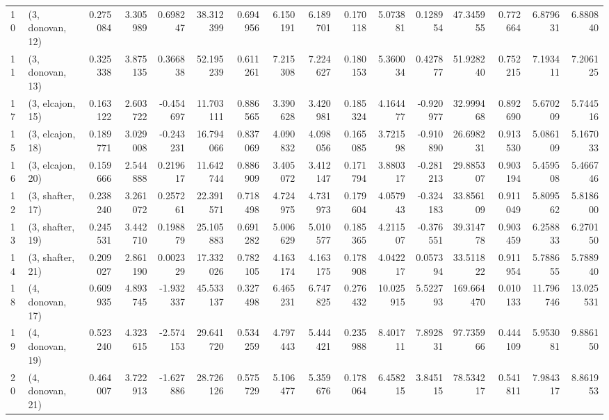 \begin{tabular}{llrrrrrrrrrrrrrr}
10 &  (3, donovan, 12) &   0.275084 &  3.305989 &  0.698247 &  38.312399 &  0.694956 &   6.150191 &  6.189701 &  0.170118 &   5.073881 &  0.128954 &   47.345955 &  0.772664 &   6.879631 &   6.880840 \\
11 &  (3, donovan, 13) &   0.325338 &  3.875135 &  0.366838 &  52.195239 &  0.611261 &   7.215308 &  7.224627 &  0.180153 &   5.360034 &  0.427877 &   51.928240 &  0.752215 &   7.193411 &   7.206125 \\
17 &  (3, elcajon, 15) &   0.163122 &  2.603722 & -0.454697 &  11.703111 &  0.886565 &   3.390628 &  3.420981 &  0.185324 &   4.164477 & -0.920977 &   32.999468 &  0.892690 &   5.670209 &   5.744516 \\
15 &  (3, elcajon, 18) &   0.189771 &  3.029008 & -0.243231 &  16.794066 &  0.837069 &   4.090832 &  4.098056 &  0.165085 &   3.721598 & -0.910890 &   26.698231 &  0.913530 &   5.086109 &   5.167033 \\
16 &  (3, elcajon, 20) &   0.159666 &  2.544888 &  0.219617 &  11.642744 &  0.886909 &   3.405072 &  3.412147 &  0.171794 &   3.880317 & -0.281213 &   29.885307 &  0.903194 &   5.459508 &   5.466746 \\
12 &  (3, shafter, 17) &   0.238240 &  3.261072 &  0.257261 &  22.391571 &  0.718498 &   4.724975 &  4.731973 &  0.179604 &   4.057943 & -0.324183 &   33.856109 &  0.911049 &   5.809562 &   5.818600 \\
13 &  (3, shafter, 19) &   0.245531 &  3.442710 &  0.198879 &  25.105883 &  0.691282 &   5.006629 &  5.010577 &  0.185365 &   4.211507 & -0.376551 &   39.314778 &  0.903459 &   6.258833 &   6.270150 \\
14 &  (3, shafter, 21) &   0.209027 &  2.861190 &  0.002329 &  17.332026 &  0.782105 &   4.163174 &  4.163175 &  0.178908 &   4.042217 &  0.057394 &   33.511822 &  0.911954 &   5.788655 &   5.788940 \\
18 &  (4, donovan, 17) &   0.609935 &  4.893745 & -1.932337 &  45.533137 &  0.327498 &   6.465231 &  6.747825 &  0.276432 &  10.025915 &  5.522793 &  169.664470 &  0.010133 &  11.796746 &  13.025531 \\
19 &  (4, donovan, 19) &   0.523240 &  4.323615 & -2.574153 &  29.641720 &  0.534259 &   4.797443 &  5.444421 &  0.235988 &   8.401711 &  7.892831 &   97.735966 &  0.444109 &   5.953081 &   9.886150 \\
20 &  (4, donovan, 21) &   0.464007 &  3.722913 & -1.627886 &  28.726126 &  0.575729 &   5.106477 &  5.359676 &  0.178064 &   6.458215 &  3.845115 &   78.534217 &  0.541811 &   7.984317 &   8.861953 \\

\end{tabular}
